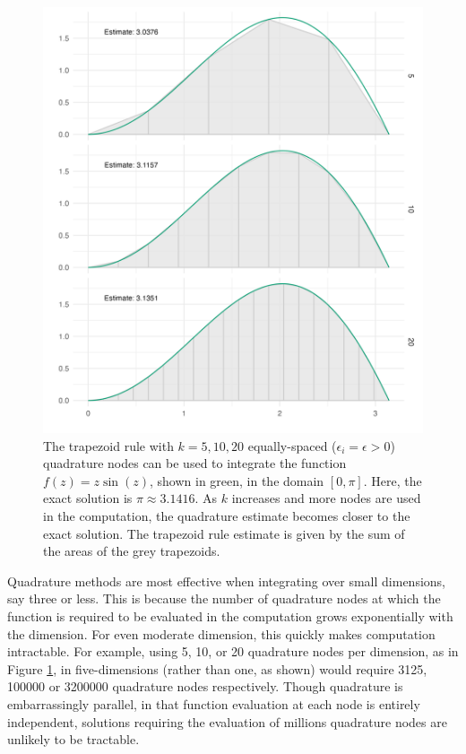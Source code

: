 \documentclass[a4paper, nobind]{templates/ociamthesis}
\begin{document}
\begin{figure}
\includegraphics[width=0.95\linewidth]{figures/naomi-aghq/trapezoid} \caption{The trapezoid rule with \(k = 5, 10, 20\) equally-spaced (\(\epsilon_i = \epsilon > 0\)) quadrature nodes can be used to integrate the function \(f(z) = z \sin(z)\), shown in green, in the domain \([0, \pi]\). Here, the exact solution is \(\pi \approx 3.1416\). As \(k\) increases and more nodes are used in the computation, the quadrature estimate becomes closer to the exact solution. The trapezoid rule estimate is given by the sum of the areas of the grey trapezoids.}\label{fig:trapezoid}
\end{figure}

Quadrature methods are most effective when integrating over small dimensions, say three or less.
This is because the number of quadrature nodes at which the function is required to be evaluated in the computation grows exponentially with the dimension.
For even moderate dimension, this quickly makes computation intractable.
For example, using 5, 10, or 20 quadrature nodes per dimension, as in Figure \ref{fig:trapezoid}, in five-dimensions (rather than one, as shown) would require 3125, 100000 or 3200000 quadrature nodes respectively.
Though quadrature is embarrassingly parallel, in that function evaluation at each node is entirely independent, solutions requiring the evaluation of millions quadrature nodes are unlikely to be tractable.
\end{document}
